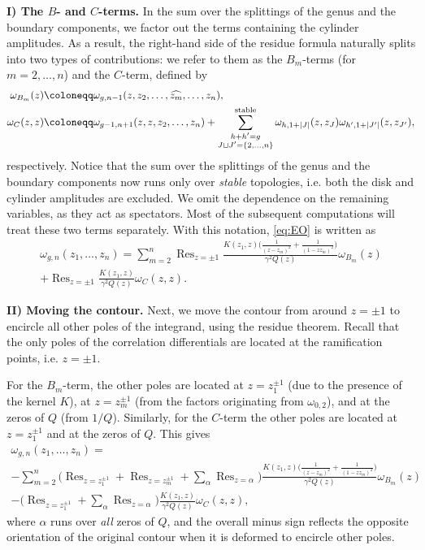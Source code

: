 \documentclass[a4paper,11pt,english]{article}
\theoremstyle{plain}
\theoremstyle{definition}
\theoremstyle{plain}
\DeclareMathOperator*{\Res}{Res}
\begin{document}
{\bfseries I) The $B$- and $C$-terms.} In the sum over the splittings of the genus and the boundary components, we factor out the terms containing the cylinder amplitudes. As a result, the right-hand side of the residue formula  naturally splits into two types of contributions: we refer to them as the $B_m$-terms (for $m = 2,\ldots,n$) and the $C$-term, defined by
\begin{equation}
\begin{aligned}
	\omega_{B_m}(z)
	&\coloneqq
	\omega_{g,n-1}(z,z_2,\ldots,\widehat{z_m},\ldots,z_n) , \\
	\omega_{C}(z,z)
	&\coloneqq
	\omega_{g-1,n+1}(z,z,z_2,\dots,z_n)
	+
	\sum_{\substack{ h + h' = g \\ J \sqcup J' = \{2,\dots,n\} }}^{\textup{stable}}
		\omega_{h,1+|J|}(z,z_{J}) \omega_{h',1+|J'|}(z,z_{J'}),
\end{aligned}
\end{equation}
respectively. Notice that the sum over the splittings of the genus and the boundary components now runs only over \emph{stable} topologies, i.e. both the disk and cylinder amplitudes are excluded. We omit the dependence on the remaining variables, as they act as spectators.
Most of the subsequent computations will treat these two terms separately. With this notation, \cref{eq:EO} is written as
\begin{multline}
	\omega_{g,n}(z_1,\dots,z_n)
	=
	\sum_{m = 2}^n
	\Res_{z = \pm 1}
		\frac{K(z_1,z) \bigl( \frac{1}{(z-z_m)^2} + \frac{1}{(1-z z_m)^2} \bigr)}{\gamma^2 Q(z)}
		\omega_{B_m}(z)
		\\
	+
	\Res_{z = \pm 1}
		\frac{K(z_1,z)}{\gamma^2 Q(z)}
		\omega_{C}(z,z) .
\end{multline}

{\bfseries II) Moving the contour.} Next, we move the contour from around $z = \pm 1$ to encircle all other poles of the integrand, using the residue theorem.
Recall that the only poles of the correlation differentials are located at the ramification points, i.e. $z = \pm 1$.

For the $B_m$-term, the other poles are located at $z = z_1^{\pm 1}$ (due to the presence of the kernel $K$), at $z = z_m^{\pm 1}$ (from the factors originating from $\omega_{0,2}$), and at the zeros of $Q$ (from $1/Q$).
Similarly, for the $C$-term the other poles are located at $z = z_1^{\pm 1}$ and at the zeros of $Q$. This gives
\begin{multline}
	\omega_{g,n}(z_1,\dots,z_n)
	= \\
	- \sum_{m = 2}^n
	\bigg(
		\Res_{z = z_1^{\pm 1}} + \Res_{z = z_m^{\pm 1}} + \sum_{\alpha} \Res_{z = \alpha}
	\bigg)
		\frac{K(z_1,z) \bigl( \frac{1}{(z-z_m)^2} + \frac{1}{(1-z z_m)^2} \bigr)}{\gamma^2 Q(z)} 
		\omega_{B_m}(z)
		\\
	-
	\bigg(
		\Res_{z = z_1^{\pm 1}} + \sum_{\alpha} \Res_{z = \alpha}
	\bigg)
	   \frac{K(z_1,z)}{\gamma^2 Q(z)} \omega_{C}(z,z),
\end{multline}
where $\alpha$ runs over \emph{all} zeros of $Q$, and the overall minus sign reflects the opposite orientation of the original contour when it is deformed to encircle other poles.
\end{document}

